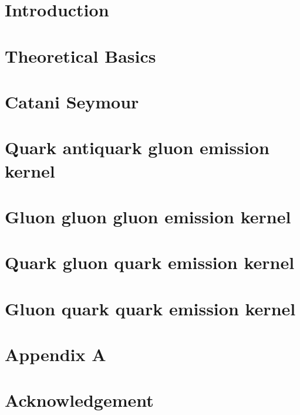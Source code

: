 \documentclass[12pt,a4paper,oneside]{report}
\begin{document}
    \parindent=0pt
    \linespread{1.2}
    \thispagestyle{plain}


\newpage

\pagebreak

\tableofcontents
\thispagestyle{empty}
\thispagestyle{empty}
\quad
\newpage
{}
\chapter*{Introduction}





\newpage
\chapter{Theoretical Basics}

\chapter{Catani Seymour}


\newpage

\chapter{Quark antiquark gluon emission kernel}

\newpage
\chapter{Gluon gluon gluon emission kernel}

\chapter{Quark gluon quark emission kernel}
  
\chapter{Gluon quark quark emission kernel}
   
\newpage



\newpage


\chapter*{Appendix A}

\newpage
\chapter*{Acknowledgement}

 
\end{document}
